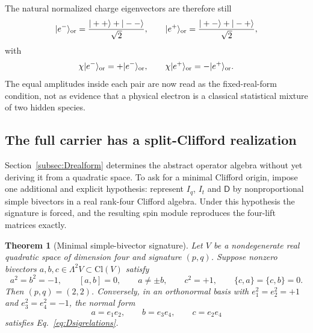 \documentclass[11pt]{article}
\newtheorem{theorem}{Theorem}[section]
\theoremstyle{definition}\newtheorem{definition}[theorem]{Definition}
\theoremstyle{remark}\newtheorem{remark}[theorem]{Remark}\newtheorem{conjecture}[theorem]{Conjecture}
\begin{document}
The natural normalized charge eigenvectors are therefore still
\begin{equation}\label{eq:Mstates}
 |e^-\rangle_{\rm or}=\frac{|++\rangle+|--\rangle}{\sqrt2},\qquad
 |e^+\rangle_{\rm or}=\frac{|+-\rangle+|-+\rangle}{\sqrt2},
\end{equation}
with
\begin{equation}
 \chi|e^-\rangle_{\rm or}=+|e^-\rangle_{\rm or},\qquad
 \chi|e^+\rangle_{\rm or}=-|e^+\rangle_{\rm or}.
\end{equation}
The equal amplitudes inside each pair are now read as the fixed-real-form condition, not as evidence that a physical electron is a classical statistical mixture of two hidden species.


\subsection{The full carrier has a split-Clifford realization}\label{subsec:Dsignature}
Section~\ref{subsec:Drealform} determines the abstract operator algebra without yet deriving it from a quadratic space. To ask for a minimal Clifford origin, impose one additional and explicit hypothesis: represent $I_q$, $I_t$ and $\mathsf D$ by nonproportional simple bivectors in a real rank-four Clifford algebra. Under this hypothesis the signature is forced, and the resulting spin module reproduces the four-lift matrices exactly.

\begin{theorem}[Minimal simple-bivector signature]\label{thm:Dsignature}
Let $V$ be a nondegenerate real quadratic space of dimension four and signature $(p,q)$. Suppose nonzero bivectors $a,b,c\in\Lambda^2V\subset\mathrm{Cl}(V)$ satisfy
\begin{equation}\label{eq:Dsigrelations}
 a^2=b^2=-1,\qquad [a,b]=0,\qquad a\neq\pm b,
 \qquad c^2=+1,\qquad \{c,a\}=\{c,b\}=0.
\end{equation}
Then $(p,q)=(2,2)$. Conversely, in an orthonormal basis with
$e_1^2=e_2^2=+1$ and $e_3^2=e_4^2=-1$, the normal form
\begin{equation}\label{eq:Dsigsolution}
 \boxed{a=e_1e_2,\qquad b=e_3e_4,\qquad c=e_2e_4}
\end{equation}
satisfies Eq.~\eqref{eq:Dsigrelations}.
\end{theorem}
\end{document}
